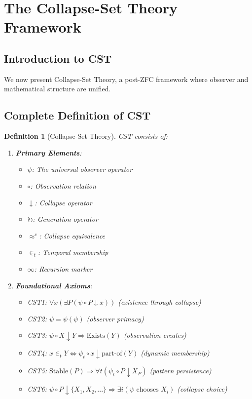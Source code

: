 \documentclass[12pt]{article}
\newtheorem{definition}[theorem]{Definition}
\begin{document}
\section{The Collapse-Set Theory Framework}

\subsection{Introduction to CST}

We now present Collapse-Set Theory, a post-ZFC framework where observer and mathematical structure are unified.

\subsection{Complete Definition of CST}

\begin{definition}[Collapse-Set Theory]
CST consists of:
\begin{enumerate}
\item \textbf{Primary Elements}: 
   \begin{itemize}
   \item $\psi$: The universal observer operator
   \item $\circ$: Observation relation
   \item $\downarrow$: Collapse operator
   \item $\circlearrowright$: Generation operator
   \item $\approx^c$: Collapse equivalence
   \item $\in_t$: Temporal membership
   \item $\infty$: Recursion marker
   \end{itemize}

\item \textbf{Foundational Axioms}:
   \begin{itemize}
   \item CST1: $\forall x (\exists P (\psi \circ P \downarrow x))$ (existence through collapse)
   \item CST2: $\psi = \psi(\psi)$ (observer primacy)
   \item CST3: $\psi \circ X \downarrow Y \Rightarrow \text{Exists}(Y)$ (observation creates)
   \item CST4: $x \in_t Y \Leftrightarrow \psi_t \circ x \downarrow \text{part-of}(Y)$ (dynamic membership)
   \item CST5: $\text{Stable}(P) \Rightarrow \forall t (\psi_t \circ P \downarrow X_P)$ (pattern persistence)
   \item CST6: $\psi \circ P \downarrow \{X_1, X_2, ...\} \Rightarrow \exists i (\psi \text{ chooses } X_i)$ (collapse choice)
   \end{itemize}
\end{enumerate}
\end{definition}
\end{document}
